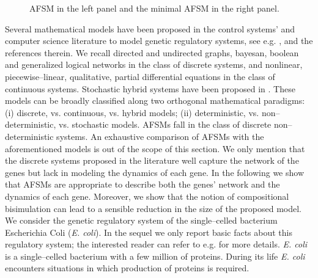 \documentclass{amsart}
\theoremstyle{definition}
\theoremstyle{remark}
\numberwithin{equation}{section}
\begin{document}
\begin{figure*}[t]
\caption{AFSM  in the left panel and the minimal AFSM  in the right panel.}
\end{figure*}
Several mathematical models have been proposed in the control systems' and computer science literature to model genetic regulatory systems, see e.g. \cite{BioSurvey}, and the references therein. We recall directed and undirected graphs, bayesan, boolean and generalized logical networks in the class of discrete systems, and nonlinear, piecewise--linear, qualitative, partial differential equations in the class of continuous systems. Stochastic hybrid systems have been proposed in \cite{Julius:08}. These models can be broadly classified along two orthogonal mathematical paradigms: (i) discrete, vs. continuous, vs. hybrid models; (ii) deterministic, vs. non--deterministic, vs. stochastic models. AFSMs fall in the class of discrete non--deterministic systems. An exhaustive comparison of AFSMs with the aforementioned models is out of the scope of this section. We only mention that the discrete systems proposed in the literature well capture the network of the genes but lack in modeling the dynamics of each gene. 
In the following we show that AFSMs are appropriate to describe both the genes' network and the dynamics of each gene. Moreover, we show that the notion of  compositional bisimulation can lead to a sensible reduction in the size of the proposed model. \\
We consider the genetic regulatory system of the single--celled bacterium Escherichia Coli (\textit{E. coli}). In the sequel we only report basic facts about this regulatory system; the interested reader can refer to e.g. \cite{BiocBook,BiocBook1,Alon} for more details. 
\textit{E. coli} is a single--celled bacterium with a few million of proteins. During its life \textit{E. coli} encounters situations in which production of proteins is required. 
\end{document}
